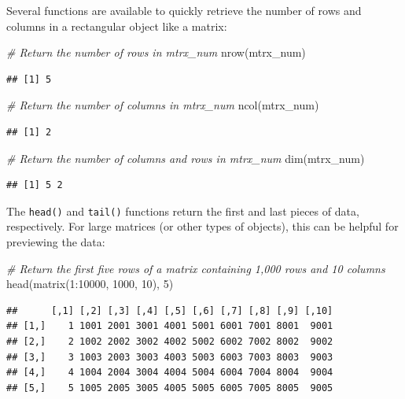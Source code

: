 \documentclass[
]{book}
\newenvironment{Shaded}{\begin{snugshade}}{\end{snugshade}}
\newcommand{\CommentTok}[1]{\textcolor[rgb]{0.56,0.35,0.01}{\textit{#1}}}
\newcommand{\DecValTok}[1]{\textcolor[rgb]{0.00,0.00,0.81}{#1}}
\newcommand{\FunctionTok}[1]{\textcolor[rgb]{0.00,0.00,0.00}{#1}}
\newcommand{\NormalTok}[1]{#1}
\newcommand{\SpecialCharTok}[1]{\textcolor[rgb]{0.00,0.00,0.00}{#1}}
\begin{document}
Several functions are available to quickly retrieve the number of rows and columns in a rectangular object like a matrix:

\begin{Shaded}
\begin{Highlighting}[]
\CommentTok{\# Return the number of rows in mtrx\_num}
\FunctionTok{nrow}\NormalTok{(mtrx\_num)}
\end{Highlighting}
\end{Shaded}

\begin{verbatim}
## [1] 5
\end{verbatim}

\begin{Shaded}
\begin{Highlighting}[]
\CommentTok{\# Return the number of columns in mtrx\_num}
\FunctionTok{ncol}\NormalTok{(mtrx\_num)}
\end{Highlighting}
\end{Shaded}

\begin{verbatim}
## [1] 2
\end{verbatim}

\begin{Shaded}
\begin{Highlighting}[]
\CommentTok{\# Return the number of columns and rows in mtrx\_num}
\FunctionTok{dim}\NormalTok{(mtrx\_num)}
\end{Highlighting}
\end{Shaded}

\begin{verbatim}
## [1] 5 2
\end{verbatim}

The \texttt{head()} and \texttt{tail()} functions return the first and last pieces of data, respectively. For large matrices (or other types of objects), this can be helpful for previewing the data:

\begin{Shaded}
\begin{Highlighting}[]
\CommentTok{\# Return the first five rows of a matrix containing 1,000 rows and 10 columns}
\FunctionTok{head}\NormalTok{(}\FunctionTok{matrix}\NormalTok{(}\DecValTok{1}\SpecialCharTok{:}\DecValTok{10000}\NormalTok{, }\DecValTok{1000}\NormalTok{, }\DecValTok{10}\NormalTok{), }\DecValTok{5}\NormalTok{)}
\end{Highlighting}
\end{Shaded}

\begin{verbatim}
##      [,1] [,2] [,3] [,4] [,5] [,6] [,7] [,8] [,9] [,10]
## [1,]    1 1001 2001 3001 4001 5001 6001 7001 8001  9001
## [2,]    2 1002 2002 3002 4002 5002 6002 7002 8002  9002
## [3,]    3 1003 2003 3003 4003 5003 6003 7003 8003  9003
## [4,]    4 1004 2004 3004 4004 5004 6004 7004 8004  9004
## [5,]    5 1005 2005 3005 4005 5005 6005 7005 8005  9005
\end{verbatim}
\end{document}
